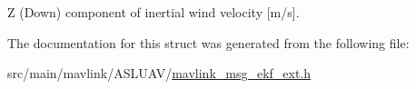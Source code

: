 Z (Down) component of inertial wind velocity \mbox{[}m/s\mbox{]}. 



The documentation for this struct was generated from the following file\+:\begin{DoxyCompactItemize}
\item 
src/main/mavlink/\+A\+S\+L\+U\+A\+V/\hyperlink{mavlink__msg__ekf__ext_8h}{mavlink\+\_\+msg\+\_\+ekf\+\_\+ext.\+h}\end{DoxyCompactItemize}
